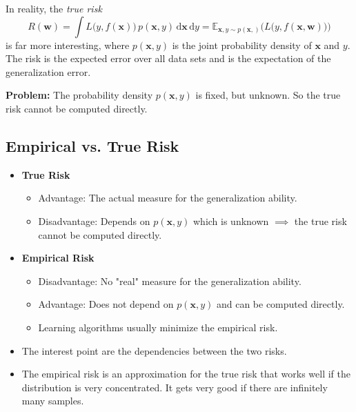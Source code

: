 \documentclass[a4paper, 11pt, accentcolor = tud3b]{tudreport}
\newcommand{\E}{\ensuremath{\mathbb{E}}}
\newcommand{\dif}[1]{\ensuremath{\,\mathrm{d}#1}}
\renewcommand{\vec}[1]{\mathbf{#1}}
\begin{document}
			In reality, the \emph{true risk}
			\begin{equation}
				R(\vec{w}) = \int L\big(y, f(\vec{x})\big) \, p(\vec{x}, y) \dif{\vec{x}} \dif{y} = \E_{ \vec{x}, y \sim p(\vec{x}, ) }\Big(\! L\big(y, f(\vec{x}, \vec{w})\big) \Big)
			\end{equation}
			is far more interesting, where \( p(\vec{x}, y) \) is the joint probability density of \(\vec{x}\) and \(y\). The risk is the expected error over all data sets and is the expectation of the generalization error.
			
			\textbf{Problem:} The probability density \( p(\vec{x}, y) \) is fixed, but unknown. So the true risk cannot be computed directly.

			\subsection{Empirical vs. True Risk}
				\begin{itemize}
					\item \textbf{True Risk}
						\begin{itemize}
							\item Advantage: The actual measure for the generalization ability.
							\item Disadvantage: Depends on \( p(\vec{x}, y) \) which is unknown \( \implies \) the true risk cannot be computed directly.
						\end{itemize}
					\item \textbf{Empirical Risk}
						\begin{itemize}
							\item Disadvantage: No "real" measure for the generalization ability.
							\item Advantage: Does not depend on \( p(\vec{x}, y) \) and can be computed directly.
							\item Learning algorithms usually minimize the empirical risk.
						\end{itemize}
					\item The interest point are the dependencies between the two risks.
					\item The empirical risk is an approximation for the true risk that works well if the distribution is very concentrated. It gets very good if there are infinitely many samples.
				\end{itemize}
\end{document}
